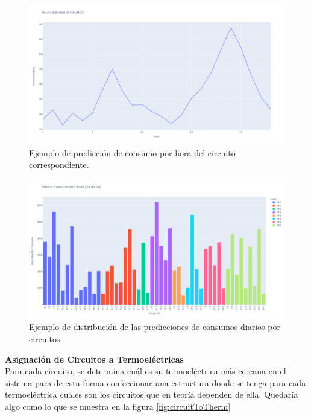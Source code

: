 \documentclass[twocolumn, fontsize=10pt]{article}
\begin{document}
\begin{figure}[H]
\centering
\includegraphics[width=\columnwidth]{assets/demandc0.png}
\caption{Ejemplo de predicción de consumo por hora del circuito correspondiente.}
\label{fig:consumoCircuito}
\end{figure}

\begin{figure}[H]
  \centering
  \includegraphics[width=\columnwidth]{assets/consume per circuit.png}
  \caption{Ejemplo de distribución de las predicciones de consumos diarios por circuitos.}
  \label{fig:consumePerCircuits}
  \end{figure}
  

\textbf{Asignación de Circuitos a Termoeléctricas}\\
 Para cada circuito, se determina cuál es su termoeléctrica más cercana en el sistema
  para de esta forma confeccionar una estructura donde se tenga para cada 
  termoeléctrica cuáles son los circuitos que en teoría dependen de ella. Quedaría algo como lo que se muestra en la figura \ref{fig:circuitToTherm}\\
\end{document}
